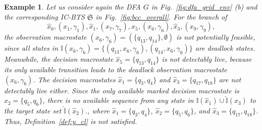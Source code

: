 \documentclass[twocolumn]{autart}
\newtheorem{myexm}{Example}
\begin{document}
\begin{myexm}\label{ex:y_z_prop}
Let us consider again the DFA $G$ in Fig.~\ref{fig:dfa_grid_env} (b) and the corresponding IC-BTS $\mathfrak{S}$ in Fig.~\ref{fig:bcc_overall}.
For the branch of 
$$
\hat{x}_{0}, (x_1, \gamma_1), \hat{x}_{1}, (x_7, \gamma_7), \hat{x}_{5}, (x_6, \gamma_6), \hat{x}_{3}, (x_9, \gamma_9),
$$
the observation macrostate $(x_6, \gamma_6) = (\{ q_{13}, q_{14} \}, \emptyset)$ is not potentially feasible, since all states in 
$
\mathbb{I}(x_6,\gamma_6) = \{(q_{13},x_6,\gamma_6),(q_{14},x_6,\gamma_6)\}
$
are deadlock states.
Meanwhile, the decision macrostate $\hat{x}_{5} = \{ q_{13}, q_{14} \}$ is not detectably live, because its only available transition leads to the deadlock observation macrostate $(x_6, \gamma_6)$.
The decision macrostates $\hat{x}_{1} = \{ q_{3}, q_{4} \}$ and $\hat{x}_{3} = \{ q_{17}, q_{18} \}$ are not detectably live either.
Since the only available marked decision macrostate is $\hat{x}_{2} = \{ q_5, q_6 \}$, there is no available sequence from any state in
$
\hat{\mathbb{I}}(\hat{x}_1)\cup \hat{\mathbb{I}}(\hat{x}_3)
$
to the target state set
$
\hat{\mathbb{I}}(\hat{x}_2).
$, 
where $\hat{x}_1 = \{ q_3, q_4 \}$, $\hat{x}_2 = \{ q_5, q_6 \}$, and $\hat{x}_3 = \{ q_{17}, q_{18} \}$. 
Thus, Definition~\ref{def:y_cl} is not satisfied.



\end{myexm}
\end{document}
